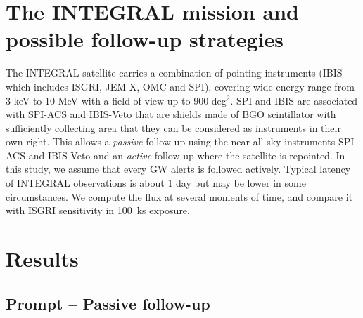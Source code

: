\documentclass[11pt]{article}
\begin{document}
\section*{The INTEGRAL mission and possible follow-up strategies}

The INTEGRAL satellite \citep{integral} carries a combination of pointing instruments (IBIS which
includes ISGRI, JEM-X, OMC and SPI), covering wide energy range from 3 keV to 10
MeV with a field of view up to 900 deg$^2$. SPI and IBIS are associated with
SPI-ACS and IBIS-Veto that are shields made of BGO scintillator with
sufficiently collecting area that they can be considered as instruments in their
own right.  This allows a \textit{passive} follow-up using the near all-sky
instruments SPI-ACS and IBIS-Veto and an \textit{active} follow-up where the
satellite is repointed.  In this study, we assume that every GW alerts is
followed actively.  Typical latency of INTEGRAL observations is about 1 day but
may be lower in some circumstances. We compute the flux at several moments of
time, and compare it with ISGRI sensitivity in 100~ks exposure.

\section*{Results}

\subsection*{Prompt -- Passive follow-up}
\end{document}
